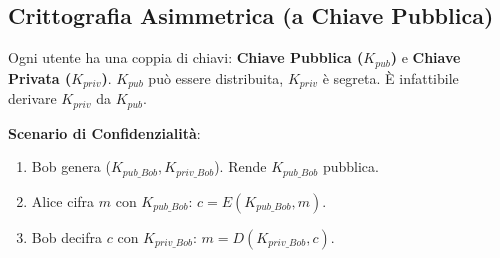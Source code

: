 \subsection{Crittografia Asimmetrica (a Chiave Pubblica)}
Ogni utente ha una coppia di chiavi: \textbf{Chiave Pubblica ($K_{pub}$)} e \textbf{Chiave Privata ($K_{priv}$)}.
$K_{pub}$ può essere distribuita, $K_{priv}$ è segreta. È infattibile derivare $K_{priv}$ da $K_{pub}$.

\textbf{Scenario di Confidenzialità}:
\begin{enumerate}
    \item Bob genera ($K_{pub\_Bob}, K_{priv\_Bob}$). Rende $K_{pub\_Bob}$ pubblica.
    \item Alice cifra $m$ con $K_{pub\_Bob}$: $c = E(K_{pub\_Bob}, m)$.
    \item Bob decifra $c$ con $K_{priv\_Bob}$: $m = D(K_{priv\_Bob}, c)$.
\end{enumerate}


